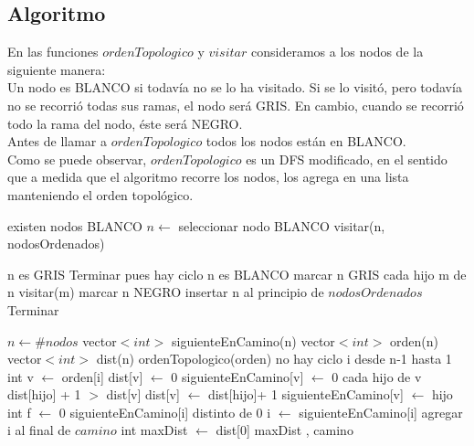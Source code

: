 \subsection{Algoritmo}

\indent En las funciones $ordenTopologico$ y $visitar$ consideramos a los nodos de la siguiente manera:\\
\indent Un nodo es BLANCO si todavía no se lo ha visitado. Si se lo visitó, pero todavía no se recorrió todas sus ramas, el nodo será GRIS. En cambio, cuando se recorrió todo la rama del nodo, éste será NEGRO.\\
\indent Antes de llamar a $ordenTopologico$ todos los nodos están en BLANCO. \\
\indent Como se puede observar, $ordenTopologico$ es un DFS modificado, en el sentido que a medida que el algoritmo recorre los nodos, los agrega en una lista manteniendo el orden topológico.\\


\begin{algorithm}[H]
\caption{} 
\begin{codebox}
\li \While existen nodos BLANCO \Do
\li	$n \gets$ seleccionar nodo BLANCO
\li	visitar(n, nodosOrdenados)

\End
\end{codebox}
\end{algorithm}


\begin{algorithm}[H]
\caption{} 
\begin{codebox}
\li \If n es GRIS \Do
\li 	 Terminar pues hay ciclo
\li \End
\li \If n es BLANCO \Do
\li 	marcar n GRIS
\li		\For cada hijo m de n \Do
\li			visitar(m)			
\li		\End
\li		marcar n NEGRO
\li 		insertar n al principio de $nodosOrdenados$
\li 		Terminar
\li \End

\End
\end{codebox}
\end{algorithm}
 


\begin{algorithm}[H]
\caption{} 
\begin{codebox}
\li $n \gets \# nodos $
\li vector$<int>$ siguienteEnCamino(n)
\li vector$<int>$ orden(n)
\li vector$<int>$ dist(n)
\li ordenTopologico(orden)
\li \If no hay ciclo \Do
\li 	\For i desde n-1 hasta 1 \Do
\li		int v $\gets$ orden[i]
\li		dist[v] $\gets$ 0
\li 		siguienteEnCamino[v] $\gets$ 0
\li		\For cada hijo de v \Do
\li		  	\If dist[hijo] + 1 $>$ dist[v] \Do
\li				dist[v] $\gets$ dist[hijo]+ 1
\li				siguienteEnCamino[v] $\gets$ hijo
\li			\End
\li		\End
\li	\End
\li	int f $\gets$ 0
\li	\While siguienteEnCamino[i] distinto de 0 \Do
\li		i $\gets$ siguienteEnCamino[i]
\li		agregar i al final de $camino$
\li	\End
\li 	int maxDist $\gets$ dist[0]
\li 	\Return maxDist , camino	
\li \End
\li \Else \Do
\li {}
\End

\end{codebox}
\end{algorithm}

